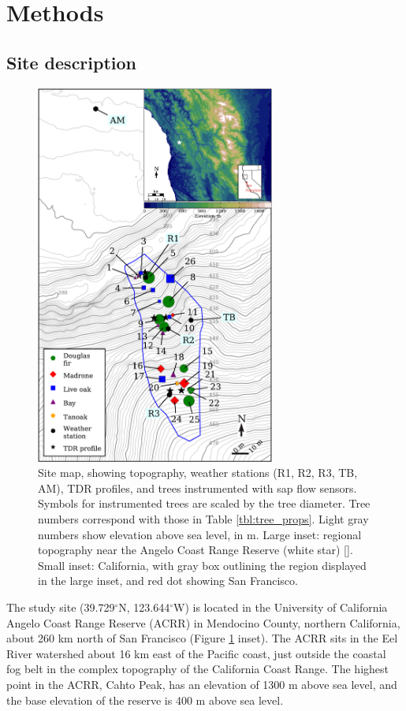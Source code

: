 \section{Methods}
\subsection{Site description}
\label{sec:sapflow_sitedesc}

\begin{figure}[here]
\includegraphics[width=0.7\textwidth]{ch1-sapflow/figures/Figure01.pdf}
\caption{Site map, showing topography, weather stations (R1, R2, R3, TB, AM), TDR profiles, and trees instrumented with sap flow sensors.  Symbols for instrumented trees are scaled by the tree diameter.  Tree numbers correspond with those in Table \ref{tbl:tree_props}.  Light gray numbers show elevation above sea level, in m.  Large inset: regional topography near the Angelo Coast Range Reserve (white star) [\cite{globe}].  Small inset: California, with gray box outlining the region displayed in the large inset, and red dot showing San Francisco.}
\label{fig:sapflow_map}
\end{figure}

The study site (39.729$^{\circ}$N, 123.644$^{\circ}$W) is located in the University of California Angelo Coast Range Reserve (ACRR) in Mendocino County, northern California, about 260 km north of San Francisco (Figure \ref{fig:sapflow_map} inset).  The ACRR sits in the Eel River watershed about 16 km east of the Pacific coast, just outside the coastal fog belt in the complex topography of the California Coast Range. The highest point in the ACRR, Cahto Peak, has an elevation of 1300 m above sea level, and the base elevation of the reserve is 400 m above sea level.
	
